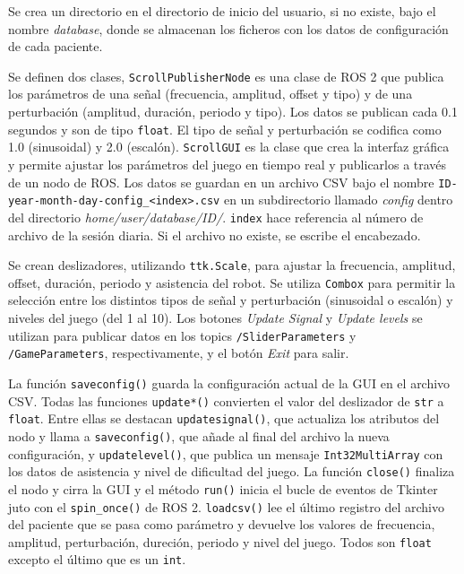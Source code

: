 Se crea un directorio en el directorio de inicio del usuario, si no existe, bajo el nombre \textit{database}, donde se almacenan los ficheros con los datos de configuración de cada paciente.

Se definen dos clases, \verb|ScrollPublisherNode| es una clase de ROS 2 que publica los parámetros de una señal (frecuencia, amplitud, offset y tipo) y de una perturbación (amplitud, duración, periodo y tipo).
Los datos se publican cada 0.1 segundos y son de tipo \verb|float|.
El tipo de señal y perturbación se codifica como 1.0 (sinusoidal) y 2.0 (escalón).
\verb|ScrollGUI| es la clase que crea la interfaz gráfica y permite ajustar los parámetros del juego en tiempo real y publicarlos a través de un nodo de ROS.
Los datos se guardan en un archivo CSV bajo el nombre \verb|ID-year-month-day-config_<index>.csv| en un subdirectorio llamado \textit{config} dentro del directorio \textit{home/user/database/ID/}.
\verb|index| hace referencia al número de archivo de la sesión diaria.
Si el archivo no existe, se escribe el encabezado.

Se crean deslizadores, utilizando \verb|ttk.Scale|, para ajustar la frecuencia, amplitud, offset, duración, periodo y asistencia del robot.
Se utiliza \verb|Combox| para permitir la selección entre los distintos tipos de señal y perturbación (sinusoidal o escalón) y niveles del juego (del 1 al 10).
Los botones \textit{Update Signal} y \textit{Update levels} se utilizan para publicar datos en los topics \verb|/SliderParameters| y \verb|/GameParameters|, respectivamente, y el botón \textit{Exit} para salir.

La función \verb|saveconfig()| guarda la configuración actual de la GUI en el archivo CSV.
Todas las funciones \verb|update*()| convierten el valor del deslizador de \verb|str| a \verb|float|.
Entre ellas se destacan \verb|updatesignal()|, que actualiza los atributos del nodo y llama a \verb|saveconfig()|, que añade al final del archivo la nueva configuración, y \verb|updatelevel()|, que publica un mensaje \verb|Int32MultiArray| con los datos de asistencia y nivel de dificultad del juego.
La función \verb|close()| finaliza el nodo y cirra la GUI y el método \verb|run()| inicia el bucle de eventos de Tkinter juto con el \verb|spin_once()| de ROS 2.
\verb|loadcsv()| lee el último registro del archivo del paciente que se pasa como parámetro y devuelve los valores de frecuencia, amplitud, perturbación, dureción, periodo y nivel del juego.
Todos son \verb|float| excepto el último que es un \verb|int|.

